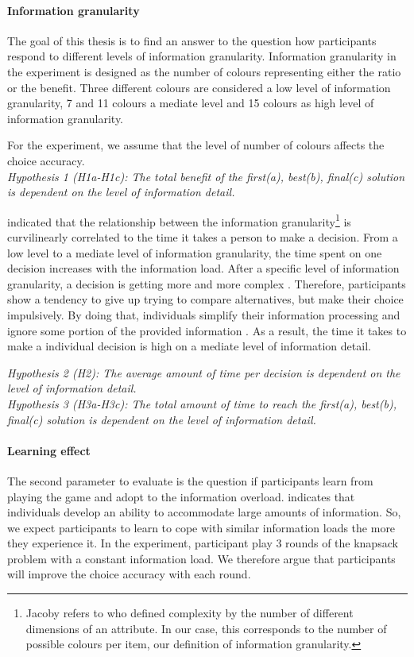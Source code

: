 \paragraph{Information granularity}
The goal of this thesis is to find an answer to the question how participants respond to different levels of information granularity.
Information granularity in the experiment is designed as the number of colours representing either the ratio or the benefit.  Three different colours are considered a low level of information granularity, 7 and 11 colours a mediate level and 15 colours as high level of information granularity.

For the experiment, we assume that the level of number of colours affects the choice accuracy.\\
\textit{Hypothesis 1 (H1a-H1c): The total benefit of the first(a), best(b), final(c) solution is dependent on the level of information detail. }

\cite{Jacoby1974} indicated that the relationship between the information granularity\footnote{Jacoby refers to \cite{Hendrick1968} who defined complexity by the number of different dimensions of an attribute. In our case, this corresponds to the number of possible colours per item, our definition of information granularity. }  is curvilinearly correlated to the time it takes a person to make a decision. From a low level to a mediate level of information granularity, the time spent on one decision increases with the information load. After a specific level of information granularity, a decision is getting more and more complex \citep{Hendrick1968}. Therefore, participants show a tendency to give up trying to compare alternatives, but make their choice impulsively. By doing that, individuals simplify their information processing and ignore some portion of the provided information \citep{Malhotra1982}.
As a result, the time it takes to make a individual decision is high on a mediate level of information detail. 

\textit{Hypothesis 2 (H2): The average amount of time per decision is dependent on the level of information detail. }\\
\textit{Hypothesis 3 (H3a-H3c): The total amount of time to reach the first(a), best(b), final(c) solution is dependent on the level of information detail. }

\paragraph{Learning effect}
The second parameter to evaluate is the question if participants learn from playing the game and adopt to the information overload. \cite{Jacoby1974} indicates that individuals develop an ability to accommodate large amounts of information. So, we expect participants to learn to cope with similar information loads the more they experience it. In the experiment, participant play 3 rounds of the knapsack problem with a constant information load. We therefore argue that participants will improve the choice accuracy with each round.


